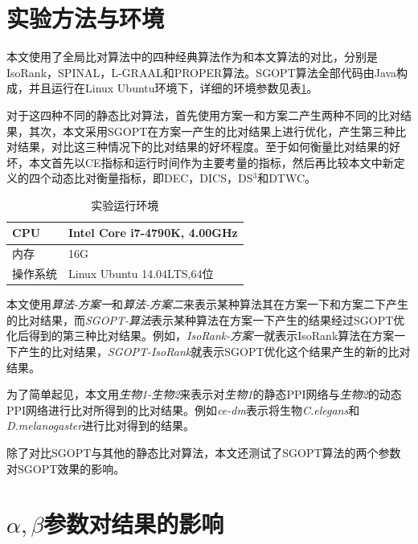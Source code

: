 \section{实验方法与环境}
本文使用了全局比对算法中的四种经典算法作为和本文算法的对比，分别是IsoRank\cite{singh2008global}，SPINAL\cite{aladaug2013spinal}，L-GRAAL\cite{malod2015graal}和PROPER\cite{kazemi2016proper}算法。SGOPT算法全部代码由Java构成，并且运行在Linux Ubuntu环境下，详细的环境参数见表\ref{table:2}。

对于这四种不同的静态比对算法，首先使用方案一和方案二产生两种不同的比对结果，其次，本文采用SGOPT在方案一产生的比对结果上进行优化，产生第三种比对结果，对比这三种情况下的比对结果的好坏程度。至于如何衡量比对结果的好坏，本文首先以CE指标和运行时间作为主要考量的指标，然后再比较本文中新定义的四个动态比对衡量指标，即DEC，DICS，DS$^3$和DTWC。

\begin{table}[htbp]
    \centering
    \caption{实验运行环境}
    \label{table:2}
    \begin{tabular}{l|l}
         \hline 
         CPU&Intel Core i7-4790K, 4.00GHz\\
         \hline
         内存&16G\\
         \hline
         操作系统&Linux Ubuntu 14.04LTS,64位\\
         \hline
    \end{tabular}
\end{table}

本文使用\textit{算法-方案一}和\textit{算法-方案二}来表示某种算法其在方案一下和方案二下产生的比对结果，而\textit{SGOPT-算法}表示某种算法在方案一下产生的结果经过SGOPT优化后得到的第三种比对结果。例如，\textit{IsoRank-方案一}就表示IsoRank算法在方案一下产生的比对结果，\textit{SGOPT-IsoRank}就表示SGOPT优化这个结果产生的新的比对结果。

为了简单起见，本文用\textit{生物1-生物2}来表示对\textit{生物1}的静态PPI网络与\textit{生物2}的动态PPI网络进行比对所得到的比对结果。例如\textit{ce-dm}表示将生物\textit{C.elegans}和\textit{D.melanogaster}进行比对得到的结果。

除了对比SGOPT与其他的静态比对算法，本文还测试了SGOPT算法的两个参数对SGOPT效果的影响。

\section{$\alpha,\beta$参数对结果的影响}

